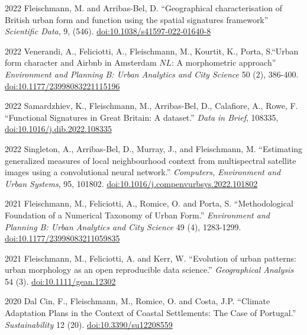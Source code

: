 \documentclass[12pt,a4paper]{report}
\begin{document}
\begin{tablist}
        \item[2022] \tab{}Fleischmann, M. and Arribas-Bel, D. \enquote{Geographical characterisation of British urban form and function using the spatial signatures framework} \textit{Scientific Data}, 9, (546). \href{https://doi.org/10.1038/s41597-022-01640-8}{doi:10.1038/s41597-022-01640-8}

        \item[2022] \tab{}Venerandi, A., Feliciotti, A., Fleischmann, M., Kourtit, K., Porta, S.\enquote{Urban form character and Airbnb in Amsterdam \(NL\): A morphometric approach} \textit{Environment and Planning B: Urban Analytics and City Science} 50 (2), 386-400. \href{https://doi.org/10.1177/23998083221115196}{doi:10.1177/23998083221115196}

        \item[2022] \tab{}Samardzhiev, K., Fleischmann, M., Arribas-Bel, D., Calafiore, A., Rowe, F. \enquote{Functional Signatures in Great Britain: A dataset.} \textit{Data in Brief}, 108335, \href{https://doi.org/10.1016/j.dib.2022.108335}{doi:10.1016/j.dib.2022.108335}

        \item[2022] \tab{}Singleton, A., Arribas-Bel, D., Murray, J., and Fleischmann, M. \enquote{Estimating generalized measures of local neighbourhood context from multispectral satellite images using a convolutional neural network.} \textit{Computers, Environment and Urban Systems}, 95, 101802. \href{https://doi.org/10.1016/j.compenvurbsys.2022.101802}{doi:10.1016/j.compenvurbsys.2022.101802}

        \item[2021] \tab{}Fleischmann, M., Feliciotti, A., Romice, O. and Porta, S. \enquote{Methodological Foundation of a Numerical Taxonomy of Urban Form.} \textit{Environment and Planning B: Urban Analytics and City Science} 49 (4), 1283-1299. \href{https://doi.org/10.1177/23998083211059835}{doi:10.1177/23998083211059835}

        \item[2021] \tab{}Fleischmann, M., Feliciotti, A. and Kerr, W. \enquote{Evolution of urban patterns: urban morphology as an open reproducible data science.} \textit{Geographical Analysis} 54 (3). \href{https://doi.org/10.1111/gean.12302}{doi:10.1111/gean.12302}

        \item[2020] \tab{}Dal Cin, F., Fleischmann, M., Romice, O. and Costa, J.P. \enquote{Climate Adaptation Plans in the Context of Coastal Settlements: The Case of Portugal.} \textit{Sustainability} 12 (20). \href{https://doi.org/10.3390/su12208559}{doi:10.3390/su12208559}


\end{tablist}
\end{document}
